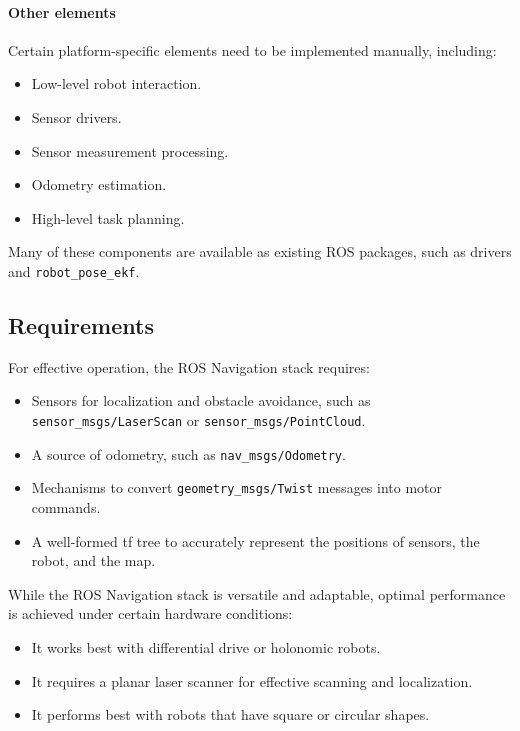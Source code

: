 \paragraph*{Other elements}
Certain platform-specific elements need to be implemented manually, including:
\begin{itemize}
    \item Low-level robot interaction.
    \item Sensor drivers.
    \item Sensor measurement processing.
    \item Odometry estimation.
    \item High-level task planning.
\end{itemize}
Many of these components are available as existing ROS packages, such as drivers and \texttt{robot\_pose\_ekf}.

\subsection{Requirements}
For effective operation, the ROS Navigation stack requires:
\begin{itemize}
    \item Sensors for localization and obstacle avoidance, such as \texttt{sensor\_msgs/LaserScan} or \texttt{sensor\_msgs/PointCloud}.
    \item A source of odometry, such as \texttt{nav\_msgs/Odometry}.
    \item Mechanisms to convert \texttt{geometry\_msgs/Twist} messages into motor commands.
    \item A well-formed tf tree to accurately represent the positions of sensors, the robot, and the map.
\end{itemize}
While the ROS Navigation stack is versatile and adaptable, optimal performance is achieved under certain hardware conditions:
\begin{itemize}
    \item It works best with differential drive or holonomic robots.
    \item It requires a planar laser scanner for effective scanning and localization.
    \item It performs best with robots that have square or circular shapes.
\end{itemize}